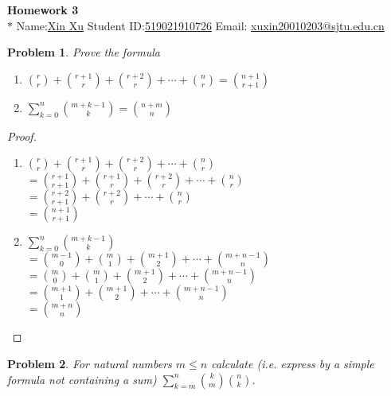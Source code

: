 \documentclass[12pt]{article}
\date{Feb 14, 2012}
\newtheorem{hw}{Problem}
\begin{document}
\begin{center}
{\LARGE\bf Homework 3}\\
\vspace{2mm}
\footnotesize{$*$ Name:\underline{Xin Xu}  \quad Student ID:\underline{519021910726} \quad Email: \underline{xuxin20010203@sjtu.edu.cn}}
\vspace{2mm}

\end{center}
\begin{hw}Prove the formula
\begin{enumerate}
\item
  ${r\choose r} +{r+1 \choose r}+{r+2 \choose r}+\cdots+{n\choose r} ={n+1 \choose r+1}$

 \item $\sum_{k=0}^{n} {m+k-1 \choose k} ={n+m \choose n}$

\end{enumerate}
\end{hw}

\begin{proof}
    \begin{enumerate}
        \item ${r\choose r} +{r+1 \choose r}+{r+2 \choose r}+\cdots+{n\choose r}$
        \\$={r+1\choose r+1} +{r+1 \choose r}+{r+2 \choose r}+\cdots+{n\choose r}$
        \\$={r+2\choose r+1} +{r+2 \choose r}+\cdots+{n\choose r}$
        \\$={n+1\choose r+1}$
        \item $\sum_{k=0}^{n} {m+k-1 \choose k}$
        \\$={m-1\choose 0}+{m\choose 1}+{m+1\choose 2}+\cdots+{m+n-1\choose n}$
        \\$={m\choose 0}+{m\choose 1}+{m+1\choose 2}+\cdots+{m+n-1\choose n}$
        \\$={m+1\choose 1}+{m+1\choose 2}+\cdots+{m+n-1\choose n}$
        \\$={m+n\choose n}$
    \end{enumerate}
\end{proof}
\begin{hw}
For natural numbers $m\leq n$ calculate (i.e. express by a simple formula not containing a sum) $\sum_{k=m}^n {k \choose m}{n \choose k}$.
\end{hw}
\end{document}
